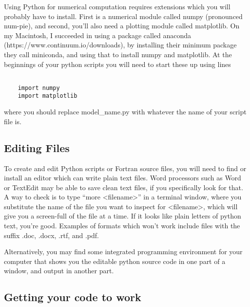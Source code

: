 Using Python for numerical computation requires extensions which you will probably have to install. First is a numerical module called numpy (pronounced num-pie), and second, you'll also need a plotting module called matplotlib. On my Macintosh, I succeeded in using a package called anaconda (https://www.continuum.io/downloads), by installing their minimum package they call miniconda, and using that to install numpy and matplotlib. At the beginnings of your python scripts you will need to start these up using lines

\begin{code}[]
	\begin{lstlisting}
	
	import numpy
	import matplotlib
	\end{lstlisting}
\end{code}

where you should replace model_name.py with whatever the name of your script file is.


\subsection{Editing Files}

To create and edit Python scripts or Fortran source files, you will need to find or install an editor which can write plain text files. Word processors such as Word or TextEdit may be able to save clean text files, if you specifically look for that. A way to check is to type “more <filename>” in a terminal window, where you substitute the name of the file you want to inspect for <filename>, which will give you a screen-full of the file at a time. If it looks like plain letters of python text, you’re good. Examples of formats which won’t work include files with the suffix .doc, .docx, .rtf, and .pdf.

Alternatively, you may find some integrated programming environment for your computer that shows you the editable python source code in one part of a window, and output in another part.

\subsection{Getting your code to work}

